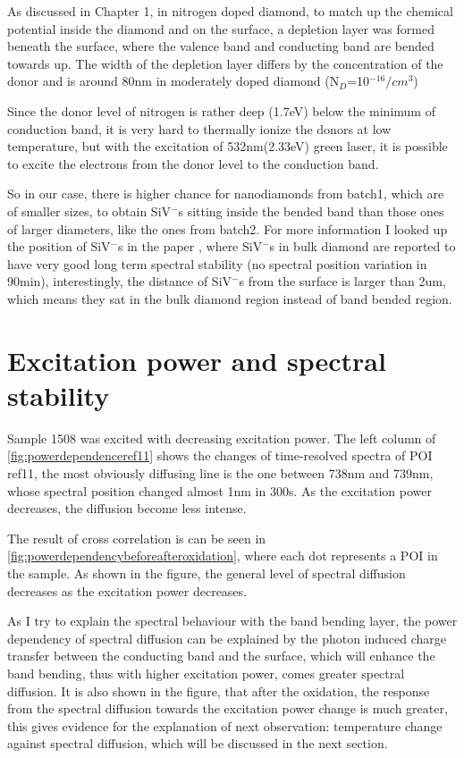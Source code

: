As discussed in Chapter 1, in nitrogen doped diamond, to match up the chemical potential inside the diamond and on the surface, a depletion layer was formed beneath the surface, where the valence band and conducting band are bended towards up. The width of the depletion layer differs by the concentration of the donor and is around 80nm in moderately doped diamond (N$_{D}$=10$^{-16}/cm^{3}$) \cite{diederich_electron_1998}

Since the donor level of nitrogen is rather deep (1.7eV) below the minimum of conduction band, it is very hard to thermally ionize the donors at low temperature, but with the excitation of 532nm(2.33eV) green laser, it is possible to excite the electrons from the donor level to the conduction band. 

So in our case, there is higher chance for nanodiamonds from batch1, which are of smaller sizes, to obtain SiV$^{-}$s sitting inside the bended band than those ones of larger diameters, like the ones from batch2. For more information I looked up the position of SiV$^{-}$s in the paper \cite{rogers_multiple_2013}, where SiV$^{-}$s in bulk diamond are reported to have very good long term spectral stability (no spectral position variation in 90min), interestingly, the distance of SiV$^{-}$s from the surface is larger than 2um, which means they sat in the bulk diamond region instead of band bended region. 


\section{Excitation power and spectral stability}

Sample 1508 was excited with decreasing excitation power. The left column of \ref{fig:powerdependenceref11} shows the changes of time-resolved spectra of POI ref11, the most obviously diffusing line is the one between 738nm and 739nm, whose spectral position changed almost 1nm in 300s. As the excitation power decreases, the diffusion become less intense.

The result of cross correlation is can be seen in \ref{fig:powerdependencybeforeafteroxidation}, where each dot represents a POI in the sample. As shown in the figure, the general level of spectral diffusion decreases as the excitation power decreases. 

As I try to explain the spectral behaviour with the band bending layer, the power dependency of spectral diffusion can be explained by the photon induced charge transfer between the conducting band and the surface, which will enhance the band bending, thus with higher excitation power, comes greater spectral diffusion. It is also shown in the figure, that after the oxidation, the response from the spectral diffusion towards the excitation power change is much greater, this gives evidence for the explanation of next observation: temperature change against spectral diffusion, which will be discussed in the next section.  
 
